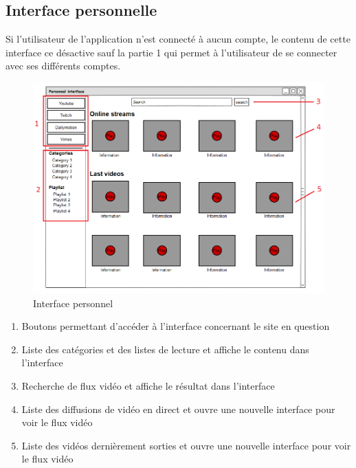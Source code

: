 \documentclass[11pt]{report} %
\begin{document}
		\subsection{Interface personnelle}
		Si l'utilisateur de l'application n'est connecté à aucun compte, le contenu de cette interface ce désactive sauf la partie 1 qui permet à l'utilisateur de se connecter avec ses différents comptes.
		\begin{figure}[h]
			\center
			\includegraphics[width=1\textwidth]{../img/personnalInterfacenum.png}
			\caption{Interface personnel}
			\label{interfacepersonnel}
		\end{figure}
		
			\begin{enumerate}
				\item Boutons permettant d'accéder à l'interface concernant le site en question
				\item Liste des catégories et des listes de lecture et affiche le contenu dans l'interface
				\item Recherche de flux vidéo et affiche le résultat dans l'interface
				\item Liste des diffusions de vidéo en direct et ouvre une nouvelle interface pour voir le flux vidéo
				\item Liste des vidéos dernièrement sorties et ouvre une nouvelle interface pour voir le flux vidéo
			\end{enumerate}
		
		\newpage		
		
\end{document}
